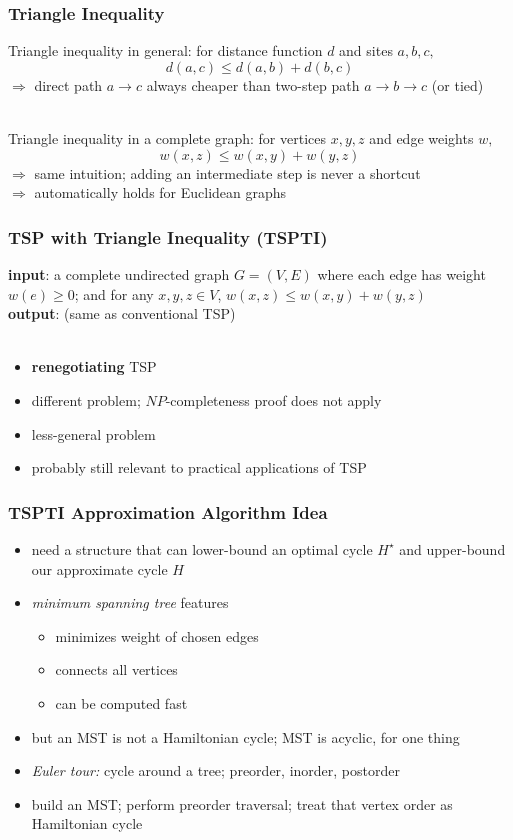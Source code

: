 \documentclass[10pt,aspectratio=169]{beamer}
\newcommand{\stanza}{ \\~\ }
\begin{document}
  \begin{frame} \frametitle{Triangle Inequality}
  Triangle inequality in general: for distance function $d$ and sites $a, b, c,$
  \[ d(a, c) \leq d(a, b) + d(b, c) \]
  $\Rightarrow$ direct path $a \rightarrow c$ always cheaper than two-step path
  $a \rightarrow b \rightarrow c$ (or tied) \stanza
  
  Triangle inequality in a complete graph: for vertices $x, y, z$ and edge weights $w,$
  \[ w(x, z) \leq w(x, y) + w(y, z) \]
  $\Rightarrow$ same intuition; adding an intermediate step is never a shortcut \\
  $\Rightarrow$ automatically holds for Euclidean graphs
  \end{frame}
  
  \begin{frame} \frametitle{TSP with Triangle Inequality (TSPTI)}
  
  \textbf{input}: a complete undirected graph $G=(V,E)$ where each edge has weight $w(e) \geq 0$;
  and for any $x, y, z \in V$, $w(x, z) \leq w(x, y) + w(y, z)$ \\
  \textbf{output}: (same as conventional TSP) \stanza
  \begin{itemize}
    \item \textbf{renegotiating} TSP
    \item different problem; $NP$-completeness proof does not apply
    \item less-general problem
    \item probably still relevant to practical applications of TSP
  \end{itemize}
  \end{frame}
  
  \begin{frame} \frametitle{TSPTI Approximation Algorithm Idea}
  \begin{itemize}
    \item need a structure that can lower-bound an optimal cycle $H^\star$ and upper-bound
      our approximate cycle $H$
    \item \emph{minimum spanning tree} features
    \begin{itemize}
      \item minimizes weight of chosen edges
      \item connects all vertices
      \item can be computed fast
    \end{itemize}
    \item but an MST is not a Hamiltonian cycle; MST is acyclic, for one thing
    \item \emph{Euler tour:} cycle around a tree; preorder, inorder, postorder
    \item build an MST; perform preorder traversal; treat that vertex order as Hamiltonian cycle
  \end{itemize}
  \end{frame}
  
\end{document}
